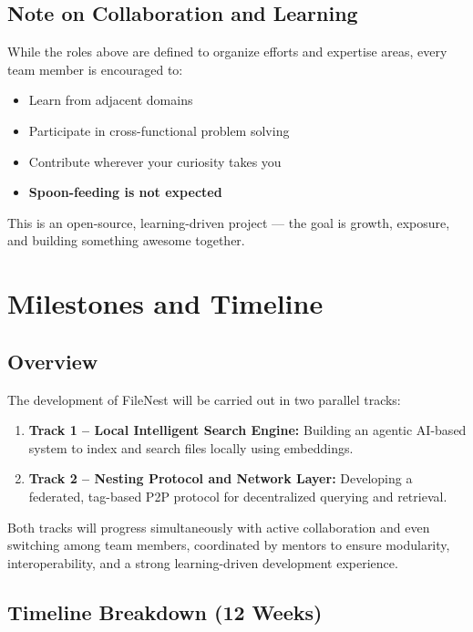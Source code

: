\documentclass[11pt,a4paper]{article}
\begin{document}
\subsection{Note on Collaboration and Learning}
While the roles above are defined to organize efforts and expertise areas, every team member is encouraged to:
\begin{itemize}
    \item Learn from adjacent domains
    \item Participate in cross-functional problem solving
    \item Contribute wherever your curiosity takes you
    \item \textbf{Spoon-feeding is not expected}
\end{itemize}
This is an open-source, learning-driven project — the goal is growth, exposure, and building something awesome together.

\section{Milestones and Timeline}

\subsection{Overview}
The development of FileNest will be carried out in two parallel tracks:
\begin{enumerate}
    \item \textbf{Track 1 – Local Intelligent Search Engine:} Building an agentic AI-based system to index and search files locally using embeddings.
    \item \textbf{Track 2 – Nesting Protocol and Network Layer:} Developing a federated, tag-based P2P protocol for decentralized querying and retrieval.
\end{enumerate}

Both tracks will progress simultaneously with active collaboration and even switching among team members, coordinated by mentors to ensure modularity, interoperability, and a strong learning-driven development experience.

\subsection{Timeline Breakdown (12 Weeks)}
\end{document}
